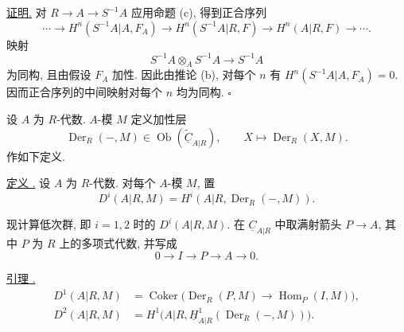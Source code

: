 \underline{证明.} 对 $R\longrightarrow A\longrightarrow S^{-1}A$
应用命题 (c), 得到正合序列
\[
 \cdots\longrightarrow H^n(S^{-1}A|A,F_A)
 \longrightarrow H^n(S^{-1}A|R,F)
 \longrightarrow H^n(A|R,F)\longrightarrow\cdots.
\]
映射
\[
 S^{-1}A\otimes_AS^{-1}A\longrightarrow S^{-1}A
\]
为同构, 且由假设 $F_A$ 加性.
因此由推论 (b),
对每个 $n$ 有 $H^n(S^{-1}A|A,F_A)=0$.
因而正合序列的中间映射对每个 $n$ 均为同构. \hfill$\square$



设 $A$ 为 $R$-代数. $A$-模 $M$ 定义加性层
\[
 \operatorname{Der}_R(-,M)
 \in\operatorname{Ob}(\widetilde{\underline C}_{A|R}),
 \qquad X\longmapsto\operatorname{Der}_R(X,M).
\]
作如下定义.

\underline{定义 .}
设 $A$ 为 $R$-代数. 对每个 $A$-模 $M$, 置
\[
 D^i(A|R,M)=H^i(A|R,\operatorname{Der}_R(-,M)).
\]

现计算低次群, 即 $i=1,2$ 时的 $D^i(A|R,M)$.
在 $\underline C_{A|R}$ 中取满射箭头 $P\longrightarrow A$,
其中 $P$ 为 $R$ 上的多项式代数, 并写成
\[
 0\longrightarrow I\longrightarrow P\longrightarrow A
 \longrightarrow0.
\]

\underline{引理 .}
\begin{align*}
 D^1(A|R,M)
 &=\operatorname{Coker}\bigl(
   \operatorname{Der}_R(P,M)\longrightarrow
   \operatorname{Hom}_P(I,M)\bigr),\\
 D^2(A|R,M)
 &=H^1\bigl(A|R,
   \underline H^1_{A|R}(\operatorname{Der}_R(-,M))\bigr).
\end{align*}

